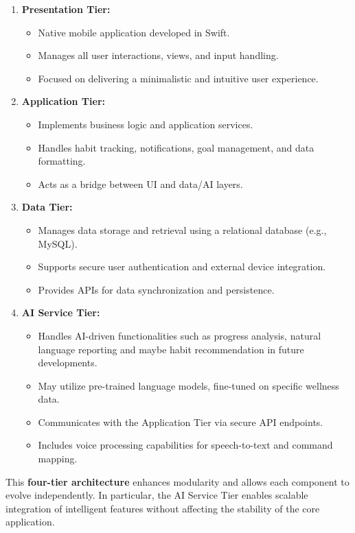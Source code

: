 \begin{enumerate}
    \item \textbf{Presentation Tier:} 
    \begin{itemize}
        \item Native mobile application developed in Swift.
        \item Manages all user interactions, views, and input handling.
        \item Focused on delivering a minimalistic and intuitive user experience.
    \end{itemize}
    
    \item \textbf{Application Tier:} 
    \begin{itemize}
        \item Implements business logic and application services.
        \item Handles habit tracking, notifications, goal management, and data formatting.
        \item Acts as a bridge between UI and data/AI layers.
    \end{itemize}
    
    \item \textbf{Data Tier:} 
    \begin{itemize}
        \item Manages data storage and retrieval using a relational database (e.g., MySQL).
        \item Supports secure user authentication and external device integration.
        \item Provides APIs for data synchronization and persistence.
    \end{itemize}
    
    \item \textbf{AI Service Tier:}
    \begin{itemize}
        \item Handles AI-driven functionalities such as progress analysis, natural language reporting and maybe habit recommendation in future developments.
        \item May utilize pre-trained language models, fine-tuned on specific wellness data.
        \item Communicates with the Application Tier via secure API endpoints.
        \item Includes voice processing capabilities for speech-to-text and command mapping.
    \end{itemize}
\end{enumerate}

This \textbf{four-tier architecture} enhances modularity and allows each component to evolve independently. In particular, the AI Service Tier enables scalable integration of intelligent features without affecting the stability of the core application.

